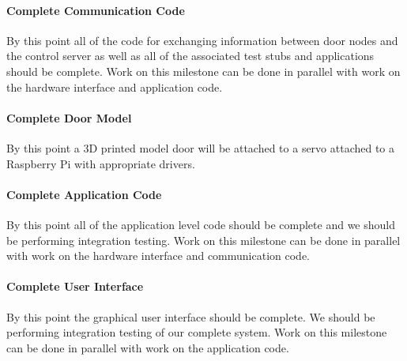 \paragraph{Complete Communication Code}
By this point all of the code for exchanging information between door
nodes and the control server as well as all of the associated test stubs and
applications should be complete. Work on this milestone can be done in parallel
with work on the hardware interface and application code.

\paragraph{Complete Door Model}
By this point a 3D printed model door will be attached to a servo
attached to a Raspberry Pi with appropriate drivers.

\paragraph{Complete Application Code}
By this point all of the application level code should be complete and we should
be performing integration testing. Work on this milestone can be done in
parallel with work on the hardware interface and communication code.

\paragraph{Complete User Interface}
By this point the graphical user interface should be complete. We should be
performing integration testing of our complete system. Work on this milestone
can be done in parallel with work on the application code.

